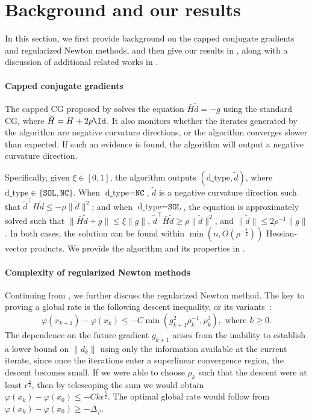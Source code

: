 
\section{Background and our results} \label{sec:main/background}

In this section, we first provide background on the capped conjugate gradients and regularized Newton methods, 
and then give our results in , along with a discussion of additional related works in .

\paragraph{Capped conjugate gradients}
The capped CG proposed by \citet{royer2020newton} solves the equation $\bar H \tilde d = -g$ using the standard CG, where $\bar H = H + 2\rho \Id$. %
It also monitors whether the iterates generated by the algorithm are negative curvature directions, or the algorithm converges slower than expected.
If such an evidence is found, the algorithm will output a negative curvature direction.

Specifically, 
given $\xi \in [0, 1]$, the algorithm outputs $(\text{d\_type}, \tilde d)$, where $\text{d\_type} \in \{ \texttt{SOL}, \texttt{NC} \}$. 
When $\text{d\_type} = \texttt{NC}$, $\tilde d$ is a negative curvature direction such that $\tilde d^\top H \tilde d \leq -\rho \| \tilde d \|^2$;
and when $\text{d\_type} = \texttt{SOL}$, the equation is approximately solved such that 
$\| \bar H \tilde d + g \| \leq \xi \| g \|$,
$\tilde d^\top\bar H\tilde d \geq \rho \| \tilde d \|^2$,
and $\| \tilde d \| \leq 2 \rho^{-1} \| g \|$.
In both cases, the solution can be found within $\min(n, \tilde O(\rho^{-\frac{1}{2}}))$ Hessian-vector products.
We provide the algorithm and its properties in .

\paragraph{Complexity of regularized Newton methods}
Continuing from , we further discuss the regularized Newton method.
The key to proving a global rate is the following descent inequality, or its variants~\citep{birgin2017use,royer2020newton,mishchenko2023regularized,doikov2024gradient,he2023newton,he2023newton-hessian,zhu2024hybrid,gratton2024yet}:
\begin{equation}
    \varphi(x_{k+1}) - \varphi(x_k) \leq -C\min\left( g_{k+1}^2 \rho_k^{-1}, \rho_k^3 \right), \text{ where } k\ge0.
\end{equation}
The dependence on the future gradient $g_{k+1}$ arises from the inability to establish a lower bound on $\| d_k \|$ using only the information available at the current iterate,
since once the iterations enter a superlinear convergence region, the descent becomes small.
If we were able to choose $\rho_k$ such that the descent were at least $\epsilon^{\frac{3}{2}}$, 
then by telescoping the sum we would obtain $\varphi(x_k) - \varphi(x_0) \leq -C k \epsilon^{\frac{3}{2}}$. The optimal global rate would follow from $\varphi(x_k) - \varphi(x_0) \geq -\Delta_\varphi$. %

